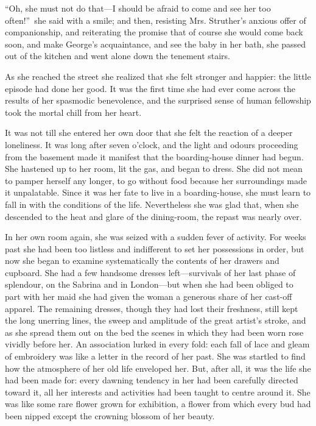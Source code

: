 \documentclass[12pt,a4paper]{book}
\begin{document}
``Oh, she must not do that---I should be afraid to come and see her
too often!''\ she said with a smile; and then, resisting Mrs.
Struther's anxious offer of companionship, and reiterating the
promise that of course she would come back soon, and make
George's acquaintance, and see the baby in her bath, she passed
out of the kitchen and went alone down the tenement stairs.







As she reached the street she realized that she felt stronger and
happier: the little episode had done her good. It was the first
time she had ever come across the results of her spasmodic
benevolence, and the surprised sense of human fellowship took the
mortal chill from her heart.





It was not till she entered her own door that she felt the
reaction of a deeper loneliness. It was long after seven o'clock,
and the light and odours proceeding from the basement made it
manifest that the boarding-house dinner had begun. She hastened
up to her room, lit the gas, and began to dress. She did not mean
to pamper herself any longer, to go without food because her
surroundings made it unpalatable. Since it was her fate to live
in a boarding-house, she must learn to fall in with the
conditions of the life. Nevertheless she was glad that, when she
descended to the heat and glare of the dining-room, the repast
was nearly over.







In her own room again, she was seized with a sudden fever of
activity. For weeks past she had been too listless and
indifferent to set her possessions in order, but now she began to
examine systematically the contents of her drawers and cupboard. 
She had a few handsome dresses left---survivals of her last phase
of splendour, on the Sabrina and in London---but when she had been
obliged to part with her maid she had given the woman a generous
share of her cast-off apparel. The remaining dresses, though they
had lost their freshness, still kept the long unerring lines, the
sweep and amplitude of the great artist's stroke, and as she
spread them out on the bed the scenes in which they had been worn
rose vividly before her. An association lurked in every fold: 
each fall of lace and gleam of embroidery was like a letter in
the record of her past. She was startled to find how the
atmosphere of her old life enveloped her. But, after all, it was
the life she had been made for: every dawning tendency in her had
been carefully directed toward it, all her interests and
activities had been taught to centre around it. She was like some
rare flower grown for exhibition, a flower from which every bud
had been nipped except the crowning blossom of her beauty.
\end{document}
